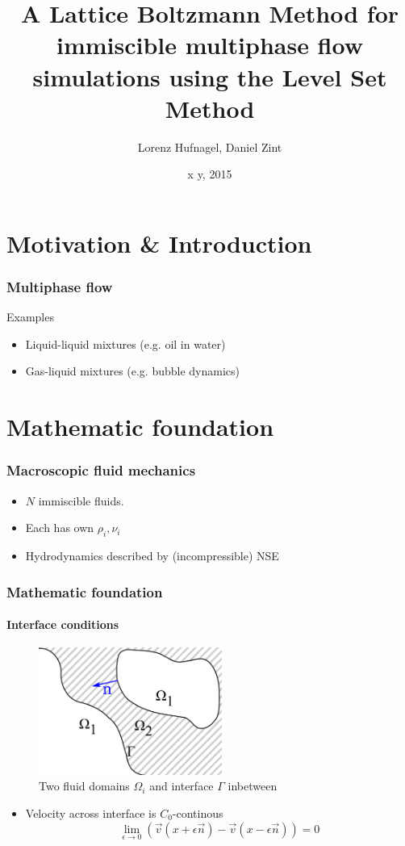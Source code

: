 \documentclass[ucs]{beamer}
\title{A Lattice Boltzmann Method for immiscible multiphase flow simulations using the Level Set Method} %
\author{Lorenz Hufnagel, Daniel Zint} %
\institute{BGCE Student Project}
\date{x y, 2015} %
\begin{document}
\maketitle %

\section{Motivation \& Introduction}

\begin{frame}
\frametitle{Multiphase flow}
Examples
\begin{itemize}
\item<1-> Liquid-liquid mixtures (e.g. oil in water) 
\item<2-> Gas-liquid mixtures (e.g. bubble dynamics)
\end{itemize}
\end{frame}

\section{Mathematic foundation}
\begin{frame}
\frametitle{Macroscopic fluid mechanics}

\begin{itemize}
\item<1-> $N$ immiscible fluids.
\item<2-> Each has own $\rho_i, \nu_i$
\item<3-> Hydrodynamics described by (incompressible) NSE
\end{itemize}
\end{frame}

\begin{frame}
\frametitle{Mathematic foundation}
\framesubtitle{Interface conditions}
\begin{figure}[h!]
\includegraphics[width=6cm]{skizze.png}
  \caption{Two fluid domains $\Omega_i$ and interface $\Gamma$ inbetween}
\end{figure}
\begin{itemize}
\item<1-> Velocity across interface is $C_0$-continous 
  $$\lim_{\epsilon \to 0}(\vec v\left(x+\epsilon \vec n\right) -\vec v(x-\epsilon \vec n))=0$$
\end{itemize}
\end{frame}
\end{document}

